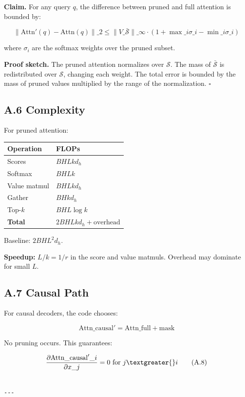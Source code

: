 \textbf{Claim.} For any query $q$, the difference between pruned and full attention is bounded by:

\[
\|\text{Attn}'(q) - \text{Attn}(q)\|\_2 \leq \|V\_{\bar{\mathcal{S}}}\|\_\infty \cdot \left(1 + \max\_i \sigma\_i - \min\_i \sigma\_i\right)
\tag{A.6}
\]

where $\sigma_i$ are the softmax weights over the pruned subset.

\textbf{Proof sketch.} The pruned attention normalizes over $\mathcal{S}$. The 
mass of $\bar{\mathcal{S}}$ is redistributed over $\mathcal{S}$, changing 
each weight. The total error is bounded by the mass of pruned values 
multiplied by the range of the normalization. $\square$

\subsection{A.6 Complexity}

For pruned attention:

\begin{table}[H]
\centering
\small
\begin{tabular}{ll}
\toprule
\textbf{Operation} & \textbf{FLOPs} \\
\midrule
Scores & $B H L k d_h$ \\
Softmax & $B H L k$ \\
Value matmul & $B H L k d_h$ \\
Gather & $B H k d_h$ \\
Top-$k$ & $B H L \log k$ \\
\textbf{Total} & $2 B H L k d_h + \text{overhead}$ \\
\bottomrule
\end{tabular}
\end{table}

Baseline: $2 B H L^2 d_h$.

\textbf{Speedup:} $L/k = 1/r$ in the score and value matmuls. Overhead may 
dominate for small $L$.

\subsection{A.7 Causal Path}

For causal decoders, the code chooses:

\[
\text{Attn}\_\text{causal}' = \text{Attn}\_\text{full} + \text{mask}
\tag{A.7}
\]

No pruning occurs. This guarantees:

\[
\frac{\partial \text{Attn}\_\text{causal}'\_i}{\partial x\_j} = 0 \text{ for } j \textgreater{} i
\tag{A.8}
\]
\begin{lstlisting}

---
\end{lstlisting}